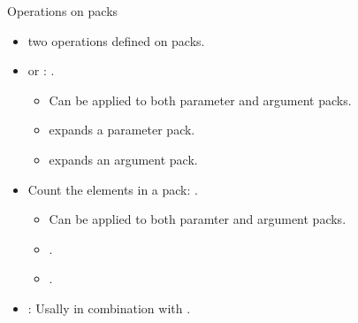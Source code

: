 \begin{frame}[t,fragile]{Operations on packs}
\begin{itemize}
  \item {} two operations defined on packs.

    \item {} or : \cppid{\ldots}.
      \begin{itemize}
        \item Can be applied to both parameter and argument packs.
        \item {} expands a parameter pack.
        \item {} expands an argument pack.
      \end{itemize}

    \item Count the elements in a pack: .
      \begin{itemize}
        \item Can be applied to both paramter and argument packs.
        \item {}\cppid{)}.
        \item {}\cppid{)}.
      \end{itemize}
 
  \item {}: Usally in combination with .
\end{itemize}
\end{frame}

